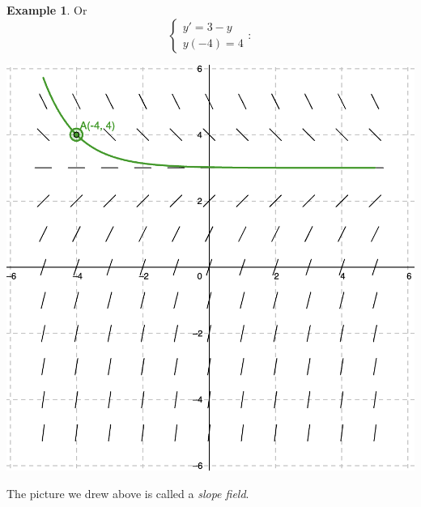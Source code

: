\documentclass[12pt]{amsart}
\numberwithin{equation}{section}
\theoremstyle{plain} %
\theoremstyle{definition}
\newtheorem{ex}[equation]{Example}
\theoremstyle{remark}
\begin{document}
\begin{ex}
Or 
\[\begin{cases} y' = 3-y \\
y(-4)= 4 \end{cases}:\]
\begin{center}\includegraphics[scale=.5]{sf3}\end{center}
\end{ex}

The picture we drew above is called a \emph{slope field}.
\end{document}
